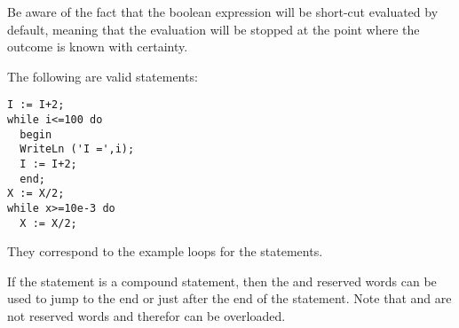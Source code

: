 Be aware of the fact that the boolean expression  will be 
short-cut evaluated by default, meaning that the evaluation will be stopped 
at the point where the outcome is known with certainty.

The following are valid  statements:
\begin{verbatim}
I := I+2;
while i<=100 do
  begin
  WriteLn ('I =',i);
  I := I+2;
  end;
X := X/2;
while x>=10e-3 do
  X := X/2;
\end{verbatim}
They correspond to the example loops for the  statements.

If the statement is a compound statement, then  the  and
 reserved words can be used to jump to the end or just
after the end of the  statement.
Note that  and  are not reserved words and therefor can be overloaded.

